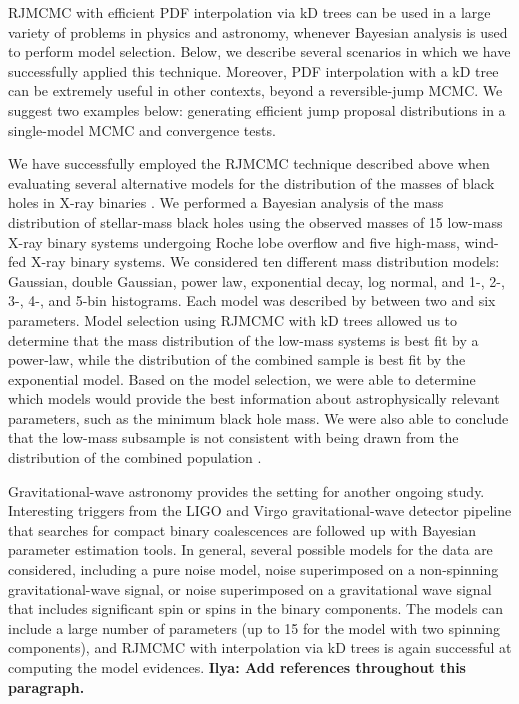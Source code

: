 \documentclass[prd,preprint]{revtex4}
\newcommand{\ilya}[1]{{\color{red} \bf Ilya: #1}}
\begin{document}
RJMCMC with efficient PDF interpolation via kD trees can be used in a large variety of problems in physics and astronomy, whenever Bayesian analysis is used to perform model selection.  Below, we describe several scenarios in which we have successfully applied this technique.  Moreover, PDF interpolation with a kD tree can be extremely useful in other contexts, beyond a reversible-jump MCMC.  We suggest two examples below: generating efficient jump proposal distributions in a single-model MCMC and convergence tests.


We have successfully employed the RJMCMC technique described above
when evaluating several alternative models for the distribution of the
masses of black holes in X-ray binaries \cite{Farr:2010}.  We
performed a Bayesian analysis of the mass distribution of stellar-mass
black holes using the observed masses of 15 low-mass X-ray binary
systems undergoing Roche lobe overflow and five high-mass, wind-fed
X-ray binary systems.  We considered ten different mass distribution
models: Gaussian, double Gaussian, power law, exponential decay, log
normal, and 1-, 2-, 3-, 4-, and 5-bin histograms.  Each model was
described by between two and six parameters.  Model selection using
RJMCMC with kD trees allowed us to determine that the mass
distribution of the low-mass systems is best fit by a power-law, while
the distribution of the combined sample is best fit by the exponential
model.  Based on the model selection, we were able to determine which
models would provide the best information about astrophysically
relevant parameters, such as the minimum black hole mass.  We were
also able to conclude that the low-mass subsample is not consistent
with being drawn from the distribution of the combined population
\cite{Farr:2010}.

Gravitational-wave astronomy provides the setting for another ongoing
study.  Interesting triggers from the LIGO and Virgo
gravitational-wave detector pipeline that searches for compact binary
coalescences are followed up with Bayesian parameter estimation tools.
In general, several possible models for the data are considered,
including a pure noise model, noise superimposed on a non-spinning
gravitational-wave signal, or noise superimposed on a gravitational
wave signal that includes significant spin or spins in the binary
components.  The models can include a large number of parameters (up
to 15 for the model with two spinning components), and RJMCMC with
interpolation via kD trees is again successful at computing the model
evidences. \ilya{Add references throughout this paragraph.}
\end{document}
